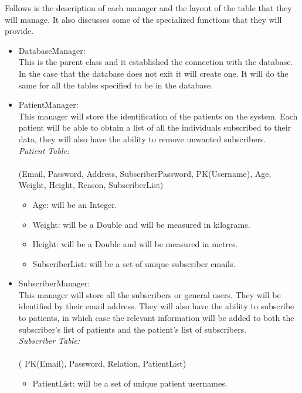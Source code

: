 Follows is the description of each manager and the layout of the table that they will manage. It also discusses some of the specialized functions that they will provide.\\
\begin{itemize}
	\item DatabaseManager:\\
This is the parent class and it established the connection with the database. In the case that the database does not exit it will create one. It will do the same for all the tables specified to be in the database.\\

	\item PatientManager:\\
	This manager will store the identification of the patients on the system. Each patient will be able to obtain a list of all the individuals subscribed to their data, they will also have the ability to remove unwanted subscribers.\\


	\emph{Patient Table:}\\\\
		(Email, Password, Address, SubscriberPassword, PK(Username), Age, Weight, Height, Reason, SubscriberList)

\begin{itemize}
	\item Age: will be an Integer.
	\item Weight: will be a Double and will be measured in kilograms.
	\item Height: will be a Double and will be measured in metres.
	\item SubscriberList: will be a set of unique subscriber emails.
\end{itemize}
		
\item SubscriberManager:\\
This manager will store all the subscribers or general users. They will be identified by their email address. They will also have the ability to subscribe to patients, in which case the relevant information will be added to both the subscriber's list of patients and the patient's list of subscribers.\\

	\emph{Subscriber Table:}\\\\
		( PK(Email), Password, Relation, PatientList)\\
\begin{itemize}
		\item PatientList: will be a set of unique patient usernames.	\\
\end{itemize}


\end{itemize}
